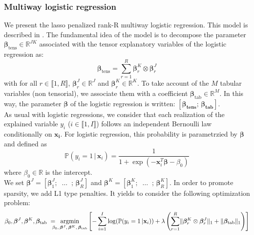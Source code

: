 \documentclass[preprint,12pt]{elsarticle}
\begin{document}
\subsubsection{Multiway logistic regression}
\noindent We present the lasso penalized rank-R multiway logistic regression. This model is described in \cite{multi_rank_r}. The fundamental idea of the model is to decompose the parameter $\bm{\beta}_{\text{tens}} \in \mathbb{R}^{JK}$ associated with the tensor explanatory variables of the logistic regression as:
\begin{equation}
    \bm{\beta}_{\text{tens}} = \sum\limits_{r = 1}^R\bm{\beta}_r^K \otimes \bm{\beta}_r^J
\end{equation}
with for all $r \in \llbracket 1 ,R \rrbracket$, $\bm{\beta}_r^J \in \mathbb{R}^J$ and $\bm{\beta}_r^K \in \mathbb{R}^K$. To take account of the $M$ tabular variables (non tensorial), we associate them with a coefficient $\bm{\beta}_{\text{tab}} \in \mathbb{R}^M$. In this way, the parameter $\bm{\beta}$ of the logistic regression is written: $\left[\bm{\beta_{\text{tens}}}; \, \bm{\beta_{\text{tab}}} \right]$.\\
As usual with logistic regressions, we consider that each realization of the explained variable $y_i$ ($i \in \llbracket 1, I \rrbracket$) follows an independent Bernoulli law conditionally on $\mathbf{x_i}$. For logistic regression, this probability is parametrzied by $\bm{\beta}$ and defined as
\begin{equation}
    \label{eqref:vraisemblance}
    \mathbb{P}( y_i = 1\, | \, \mathbf{x}_i) = \frac{1}{1 + \exp(- \mathbf{x}_i^T \bm{\beta} - \beta_0)}
\end{equation}
where  $\beta_0 \in \mathbb{R}$ is the intercept.\\ %

\noindent We set  $\bm{\beta}^J = \left[\bm{\beta}_1^J ; \;\; \hdots \; \; ;\,\bm{\beta}_R^J \right]$ and  $\bm{\beta}^K = \left[\bm{\beta}_1^K; \; \; \hdots \; \; ;\,\bm{\beta}_R^K \right]$.
\vspace{5 pt}
\noindent In order to promote sparsity, we add L1 type penalties. It yields to consider the following optimization problem: %
\begin{equation}
    \beta_0, \bm{\beta}^J, \bm{\beta}^K, \bm{\beta}_{\text{tab}} \; = \hspace{-8pt} \underset{\beta_0 ,\, \bm{\beta}^J, \, \bm{\beta}^K, \, \bm{\beta}_{\text{tab}}}{\text{argmin}} \left[ - \sum\limits_{i = 1}^{I} \log(\mathbb{P}(y_i = 1 \, | \mathbf{x}_i)) + \lambda \left(\sum\limits_{r = 1}^R
    \lVert \bm{\beta}_r^K \otimes \bm{\beta}_r^J \rVert_1 + \lVert \bm{\beta}_{\text{tab}} \rVert_1 \right)\right]
\end{equation}
\end{document}
